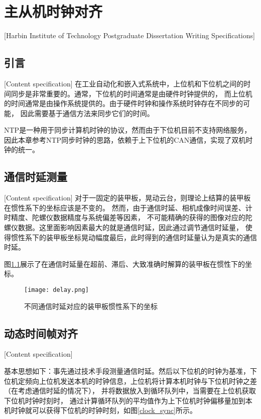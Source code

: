 \chapter[主从机时钟对齐]{主从机时钟对齐}[Harbin Institute of Technology Postgraduate Dissertation Writing Specifications]

\section{引言}[Content specification]
在工业自动化和嵌入式系统中，上位机和下位机之间的时间同步是非常重要的。通常，下位机的时间通常是由硬件时钟提供的，
而上位机的时间通常是由操作系统提供的。由于硬件时钟和操作系统时钟存在不同步的可能，
因此需要基于通信方法来同步它们的时间。\par

NTP是一种用于同步计算机时钟的协议，然而由于下位机目前不支持网络服务，
因此本章参考NTP同步时钟的思路，依赖于上下位机的CAN通信，实现了双机时钟的统一。

\section{通信时延测量}[Content specification]
对于一固定的装甲板，晃动云台，则理论上结算的装甲板在惯性系下的坐标应该是不变的。
然而，由于通信时延、相机成像时间误差、计时精度、陀螺仪数据精度与系统偏差等因素，
不可能精确的获得的图像对应的陀螺仪数据。这里面影响因素最大的就是通信时延，因此通过调节通信时延量，
使得惯性系下的装甲板坐标晃动幅度最后，此时得到的通信时延量认为是真实的通信时延。
\par
图\ref{delay}展示了在通信时延量在超前、滞后、大致准确时解算的装甲板在惯性下的坐标。
\begin{figure}[H]
    \centering
    \texttt{[image: delay.png]} 
    \caption{不同通信时延对应的装甲板惯性系下的坐标} 
    \label{delay}
\end{figure}

\section{动态时间帧对齐}[Content specification]

基本思想如下：事先通过技术手段测量通信时延。然后以下位机的时钟为基准，下位机定频向上位机发送本机的时钟信息，上位机将计算本机时钟与下位机时钟之差（在考虑通信时延的情况下），
并将数据放入到循环队列中，当需要在上位机获取下位机时钟时刻时，
通过计算循环队列的平均值作为上下位机时钟偏移量加到本机时钟就可以获得下位机的时钟时刻，如图\ref{clock_sync}所示。


